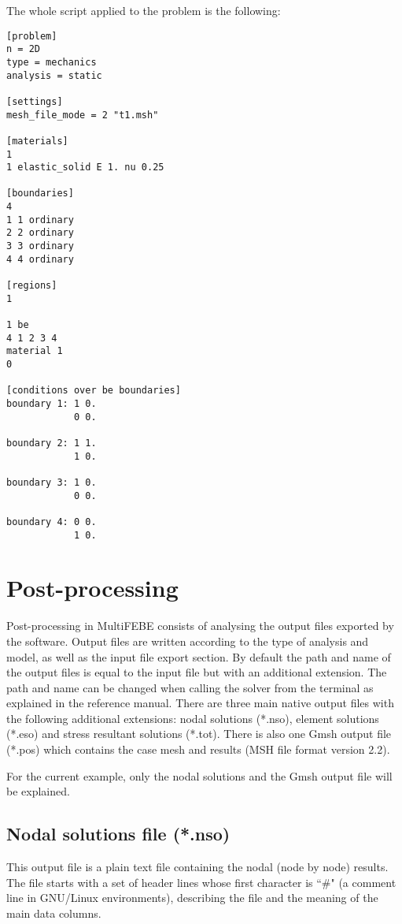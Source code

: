 \documentclass[A4]{article}
\begin{document}
The whole script applied to the problem is the following:

\begin{Verbatim}
[problem]
n = 2D
type = mechanics
analysis = static

[settings]
mesh_file_mode = 2 "t1.msh"

[materials]
1
1 elastic_solid E 1. nu 0.25

[boundaries]
4
1 1 ordinary
2 2 ordinary
3 3 ordinary
4 4 ordinary

[regions]
1

1 be
4 1 2 3 4
material 1
0

[conditions over be boundaries]
boundary 1: 1 0.
            0 0.

boundary 2: 1 1.
            1 0.

boundary 3: 1 0.
            0 0.

boundary 4: 0 0.
            1 0.           
\end{Verbatim}

\section{Post-processing}

Post-processing in MultiFEBE consists of analysing the output files exported by the software. Output files are written according to the type of analysis and model, as well as the input file export section. By default the path and name of the output files is equal to the input file but with an additional extension. The path and name can be changed when calling the solver from the terminal as explained in the reference manual. There are three main native output files with the following additional extensions: nodal solutions (*.nso), element solutions (*.eso) and stress resultant solutions (*.tot). There is also one Gmsh output file (*.pos) which contains the case mesh and results (MSH file format version 2.2). 

For the current example, only the nodal solutions and the Gmsh output file will be explained.   

\subsection{Nodal solutions file (*.nso)}

This output file is a plain text file containing the nodal (node by node) results. The file starts with a set of header lines whose first character is ``$\#$" (a comment line in GNU/Linux environments), describing the file and the meaning of the main data columns. 
\end{document}
